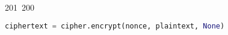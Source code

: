 201~200~\documentclass{article}
\begin{document}
\begin{lstlisting}[language=Python, caption=Encrypting a Message with ChaCha20-Poly1305]
	                                                                                                                                                                                                                                                                                                	                                                                                                                                        	    	                                                                                                	                                                                                                                                                                                                                                                                                                                                	                                                                        	                                                                        	                                                                                                                                        	                                                                                                                                                                                                                        	                                                                                                                            	                                                                	                                                                                                                                        ciphertext = cipher.encrypt(nonce, plaintext, None)

\end{lstlisting}
\end{document}

